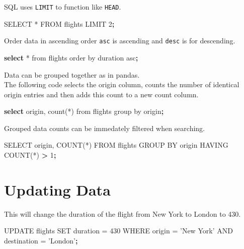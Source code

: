 \documentclass[]{book}
\newenvironment{Shaded}{\begin{snugshade}}{\end{snugshade}}
\newcommand{\KeywordTok}[1]{\textcolor[rgb]{0.13,0.29,0.53}{\textbf{#1}}}
\newcommand{\StringTok}[1]{\textcolor[rgb]{0.31,0.60,0.02}{#1}}
\newcommand{\OperatorTok}[1]{\textcolor[rgb]{0.81,0.36,0.00}{\textbf{#1}}}
\newcommand{\ExtensionTok}[1]{#1}
\newcommand{\NormalTok}[1]{#1}
\begin{document}
SQL uses \texttt{LIMIT} to function like \texttt{HEAD}.

\begin{Shaded}
\begin{Highlighting}[]
\ExtensionTok{SELECT}\NormalTok{ * FROM flights LIMIT 2}\KeywordTok{;}
\end{Highlighting}
\end{Shaded}

Order data in ascending order \texttt{asc} is ascending and
\texttt{desc} is for descending.

\begin{Shaded}
\begin{Highlighting}[]
\KeywordTok{select} \ExtensionTok{*}\NormalTok{ from flights order by duration asc}\KeywordTok{;}
\end{Highlighting}
\end{Shaded}

Data can be grouped together as in pandas.\\
The following code selects the origin column, counts the number of
identical origin entries and then adds this count to a new count column.

\begin{Shaded}
\begin{Highlighting}[]
\KeywordTok{select} \ExtensionTok{origin}\NormalTok{, count(*) }\ExtensionTok{from}\NormalTok{ flights group by origin}\KeywordTok{;}
\end{Highlighting}
\end{Shaded}

Grouped data counts can be immedately filtered when searching.

\begin{Shaded}
\begin{Highlighting}[]
\ExtensionTok{SELECT}\NormalTok{ origin, COUNT(*) }\ExtensionTok{FROM}\NormalTok{ flights GROUP BY origin HAVING COUNT(*) }\OperatorTok{>} \ExtensionTok{1}\KeywordTok{;}
\end{Highlighting}
\end{Shaded}

\section{Updating Data}\label{updating-data}

This will change the duration of the flight from New York to London to
430.

\begin{Shaded}
\begin{Highlighting}[]
\ExtensionTok{UPDATE}\NormalTok{ flights}
\ExtensionTok{SET}\NormalTok{ duration = 430}
\ExtensionTok{WHERE}\NormalTok{ origin = }\StringTok{'New York'}
\ExtensionTok{AND}\NormalTok{ destination = }\StringTok{'London'}\KeywordTok{;}
\end{Highlighting}
\end{Shaded}
\end{document}

